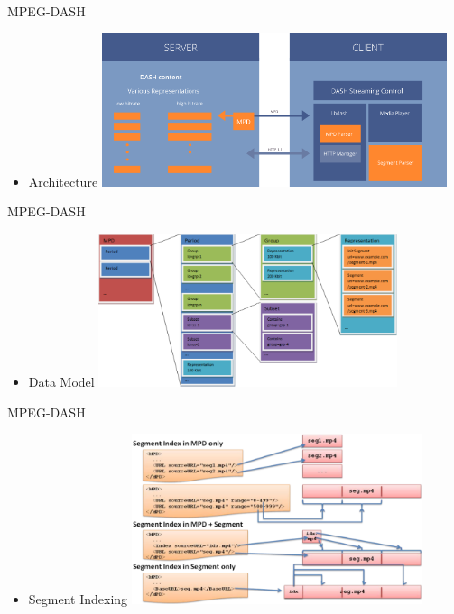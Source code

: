 \documentclass{beamer}
\begin{document}
\begin{frame}{MPEG-DASH}
	\begin{itemize}
		\item<1> Architecture
		\includegraphics[height=4.5cm]{fig/MPEG-DASH_arch.png}
	\end{itemize}
\end{frame}
\begin{frame}{MPEG-DASH}
	\begin{itemize}
		\item<1> Data Model
		\includegraphics[height=4.5cm]{fig/mpeg-dash_data_model.png}
	\end{itemize}
\end{frame}
\begin{frame}{MPEG-DASH}
	\begin{itemize}
		\item<1> Segment Indexing
		\includegraphics[height=5cm]{fig/mpeg-dash_indexing.png}
	\end{itemize}
\end{frame}
\end{document}
